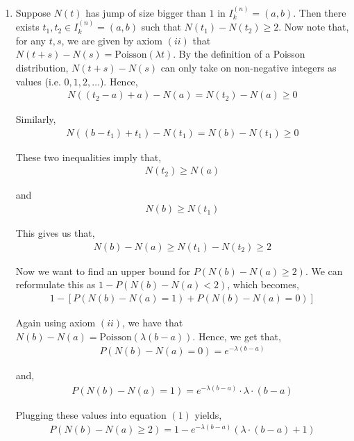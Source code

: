 \documentclass[12pt]{article}
\newenvironment{problem}[2][Problem]{\begin{trivlist}
\item[\hskip \labelsep {\bfseries #1}\hskip \labelsep {\bfseries #2.}]}{\end{trivlist}}
\begin{document}
\begin{problem}{4}
\end{problem}

\begin{enumerate}[label=(\Alph*)]

\item Suppose $N(t)$ has jump of size bigger than $1$ in $I_k^{(n)} = (a, b)$. Then there exists $t_1, t_2 \in I_k^{(n)} = (a, b)$ such that $N(t_1) - N(t_2) \geq 2$. Now note that, for any $t, s$, we are given by axiom $(ii)$ that $N(t+s) - N(s) = \text{Poisson}(\lambda t)$. By the definition of a Poisson distribution, $N(t + s) - N(s)$ can only take on non-negative integers as values (i.e. $0, 1, 2, \ldots$). Hence,
\begin{align*}
N((t_2 - a) + a) - N(a) = N(t_2) - N(a) \geq 0
\end{align*}

Similarly,
\begin{align*}
N((b - t_1) + t_1) - N(t_1) = N(b) - N(t_1) \geq 0
\end{align*}

These two inequalities imply that,
\begin{align*}
N(t_2) \geq N(a)
\end{align*}

and
\begin{align*}
N(b) \geq N(t_1)
\end{align*}

This gives us that,
\begin{align*}
N(b) - N(a) \geq N(t_1) - N(t_2) \geq 2
\end{align*}

Now we want to find an upper bound for $P(N(b) - N(a) \geq 2)$. We can reformulate this as $1 - P(N(b) - N(a) < 2)$, which becomes,
\begin{align}
1 - \left[P(N(b) - N(a) = 1) + P(N(b) - N(a) = 0)\right]
\end{align}

Again using axiom $(ii)$, we have that $N(b) - N(a) = \text{Poisson}(\lambda (b-a))$. Hence, we get that,
\begin{align*}
P(N(b) - N(a) = 0) = e^{-\lambda (b-a)}
\end{align*}

and,
\begin{align*}
P(N(b) - N(a) = 1) = e^{-\lambda (b-a)} \cdot \lambda \cdot (b-a)
\end{align*}

Plugging these values into equation $(1)$ yields,
\begin{align}
P(N(b) - N(a) \geq 2) = 1 - e^{-\lambda (b-a)}  \left( \lambda \cdot (b-a) + 1 \right)
\end{align}


\end{enumerate}
\end{document}
